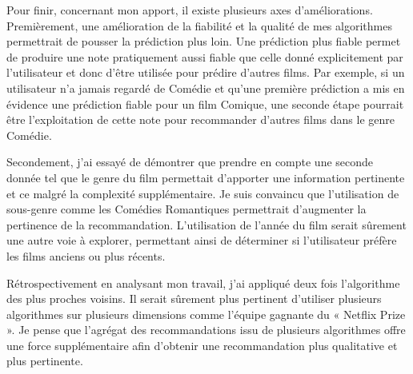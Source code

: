 \vspace{5mm}

Pour finir, concernant mon apport, il existe plusieurs axes d’améliorations. Premièrement, une amélioration de la fiabilité et la qualité de mes algorithmes permettrait de pousser la prédiction plus loin. Une prédiction plus fiable permet de produire une note pratiquement aussi fiable que celle donné explicitement par l’utilisateur et donc d’être utilisée pour prédire d’autres films. Par exemple, si un utilisateur n’a jamais regardé de Comédie et qu'une première prédiction a mis en évidence une prédiction fiable pour un film Comique, une seconde étape pourrait être l’exploitation de cette note pour recommander d’autres films dans le genre Comédie. 

\vspace{5mm}

Secondement, j’ai essayé de démontrer que prendre en compte une seconde donnée tel que le genre du film permettait d’apporter une information pertinente et ce malgré la complexité supplémentaire. Je suis convaincu que l’utilisation de sous-genre comme les Comédies Romantiques permettrait d’augmenter la pertinence de la recommandation. L’utilisation de l’année du film serait sûrement une autre voie à explorer, permettant ainsi de déterminer si l’utilisateur préfère les films anciens ou plus récents. 

\vspace{5mm} 

Rétrospectivement en analysant mon travail, j’ai appliqué deux fois l’algorithme des plus proches voisins. Il serait sûrement plus pertinent d’utiliser plusieurs algorithmes sur plusieurs dimensions comme l’équipe gagnante du « Netflix Prize ». Je pense que l’agrégat des recommandations issu de plusieurs algorithmes offre une force supplémentaire afin d’obtenir une recommandation plus qualitative et plus pertinente. 
